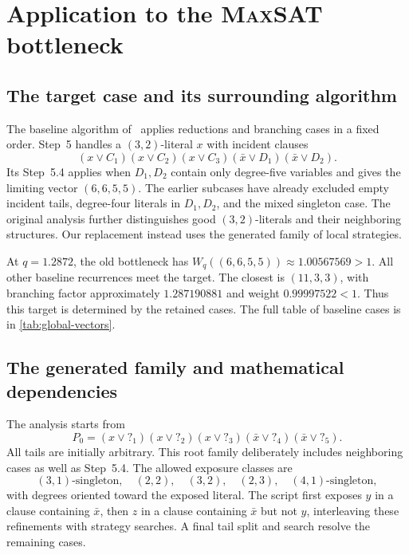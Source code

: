 \documentclass[11pt]{article}
\newcommand{\MaxSAT}{\textnormal{\textsc{MaxSAT}}}
\newcommand{\tail}[1]{\mathord{?}_{#1}}
\theoremstyle{definition}
\theoremstyle{remark}
\begin{document}
\section{Application to the \MaxSAT{} bottleneck}
\label{sec:global}

\subsection{The target case and its surrounding algorithm}
\label{sec:bottleneck}

The baseline algorithm of~\cite{Xiao2022}
applies reductions and branching cases in a fixed order. Step~5 handles a
$(3,2)$-literal $x$ with incident clauses
\begin{equation}
 (x\vee C_1)(x\vee C_2)(x\vee C_3)
 (\bar x\vee D_1)(\bar x\vee D_2).
 \label{eq:neighborhood}
\end{equation}
Its Step~5.4 applies when $D_1,D_2$ contain only degree-five variables and
gives the limiting vector $(6,6,5,5)$. The earlier subcases have already
excluded empty incident tails, degree-four literals in $D_1,D_2$, and the
mixed singleton case. The original analysis further distinguishes good
$(3,2)$-literals and their neighboring structures. Our replacement instead
uses the generated family of local strategies.

At $q=1.2872$, the old bottleneck has
$W_q((6,6,5,5))\approx1.00567569>1$. All other baseline recurrences meet
the target. The closest is $(11,3,3)$, with branching factor approximately
$1.287190881$ and weight $0.99997522<1$. Thus this target is determined by
the retained cases. The full table of baseline cases is in
\cref{tab:global-vectors}.

\subsection{The generated family and mathematical dependencies}
\label{sec:configuration}

The analysis starts from
\begin{equation}
 P_0=(x\vee\tail{1})(x\vee\tail{2})(x\vee\tail{3})
     (\bar x\vee\tail{4})(\bar x\vee\tail{5}).
 \label{eq:root}
\end{equation}
All tails are initially arbitrary. This root family deliberately includes
neighboring cases as well as Step~5.4. The allowed exposure classes are
\[
 (3,1)\text{-singleton},\quad (2,2),\quad (3,2),\quad
 (2,3),\quad (4,1)\text{-singleton},
\]
with degrees oriented toward the exposed literal.
The script first exposes $y$ in a clause containing $\bar x$, then $z$ in a
clause containing $\bar x$ but not $y$, interleaving these refinements with
strategy searches. A final tail split and search resolve the remaining cases.
\end{document}
